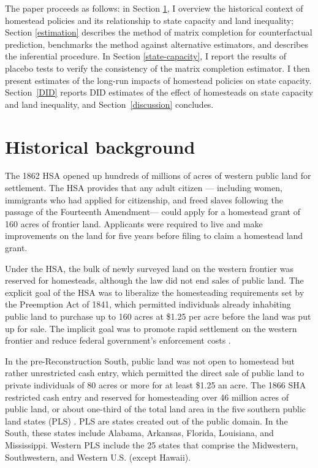 The paper proceeds as follows: in Section \ref{history}, I overview the historical context of homestead policies and its relationship to state capacity and land inequality; Section \ref{estimation} describes the method of matrix completion for counterfactual prediction, benchmarks the method against alternative estimators, and describes the inferential procedure. In Section \ref{state-capacity}, I report the results of placebo tests to verify the consistency of the matrix completion estimator. I then present estimates of the long-run impacts of homestead policies on state capacity. Section~\ref{DID} reports DID estimates of the effect of homesteads on state capacity and land inequality, and Section~\ref{discussion} concludes. 

\section{Historical background} \label{history}

The 1862 HSA opened up hundreds of millions of acres of western public land for settlement. The HSA provides that any adult citizen --- including women, immigrants who had applied for citizenship, and freed slaves following the passage of the Fourteenth Amendment---  could apply for a homestead grant of 160 acres of frontier land. Applicants were required to live and make improvements on the land for five years before filing to claim a homestead land grant. 

Under the HSA, the bulk of newly surveyed land on the western frontier was reserved for homesteads, although the law did not end sales of public land. The explicit goal of the HSA was to liberalize the homesteading requirements set by the Preemption Act of 1841, which permitted individuals already inhabiting public land to purchase up to 160 acres at \$1.25 per acre before the land was put up for sale. The implicit goal was to promote rapid settlement on the western frontier and reduce federal government's enforcement costs \citep{allen1991homesteading}. 

In the pre-Reconstruction South, public land was not open to homestead but rather unrestricted cash entry, which permitted the direct sale of public land to private individuals of 80 acres or more for at least \$1.25 an acre. The 1866 SHA restricted cash entry and reserved for homesteading over 46 million acres of public land, or about one-third of the total land area in the five southern public land states (PLS) \citep[pp. 13]{lanza1999agrarianism}. PLS are states created out of the public domain. In the South, these states include Alabama, Arkansas, Florida, Louisiana, and Mississippi. Western PLS include the 25 states that comprise the Midwestern, Southwestern, and Western U.S. (except Hawaii). 

